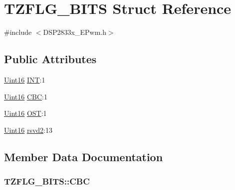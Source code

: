 \hypertarget{struct_t_z_f_l_g___b_i_t_s}{}\section{T\+Z\+F\+L\+G\+\_\+\+B\+I\+T\+S Struct Reference}
\label{struct_t_z_f_l_g___b_i_t_s}


{\ttfamily \#include $<$D\+S\+P2833x\+\_\+\+E\+Pwm.\+h$>$}

\subsection*{Public Attributes}
\begin{DoxyCompactItemize}
\item 
\hyperlink{_d_s_p2833x___device_8h_a59a9f6be4562c327cbfb4f7e8e18f08b}{Uint16} \hyperlink{struct_t_z_f_l_g___b_i_t_s_a30a47948c9f09737b1738836c0675cb8}{I\+N\+T}\+:1
\item 
\hyperlink{_d_s_p2833x___device_8h_a59a9f6be4562c327cbfb4f7e8e18f08b}{Uint16} \hyperlink{struct_t_z_f_l_g___b_i_t_s_ad6b725c9618183cdf803205bebdc4c2b}{C\+B\+C}\+:1
\item 
\hyperlink{_d_s_p2833x___device_8h_a59a9f6be4562c327cbfb4f7e8e18f08b}{Uint16} \hyperlink{struct_t_z_f_l_g___b_i_t_s_a1470de850b06afeaad899784e95a75c9}{O\+S\+T}\+:1
\item 
\hyperlink{_d_s_p2833x___device_8h_a59a9f6be4562c327cbfb4f7e8e18f08b}{Uint16} \hyperlink{struct_t_z_f_l_g___b_i_t_s_ab551b38c80c2eb56f237ecc27053b090}{rsvd2}\+:13
\end{DoxyCompactItemize}


\subsection{Member Data Documentation}
\hypertarget{struct_t_z_f_l_g___b_i_t_s_ad6b725c9618183cdf803205bebdc4c2b}{}
\subsubsection[{C\+B\+C}]{ T\+Z\+F\+L\+G\+\_\+\+B\+I\+T\+S\+::\+C\+B\+C}\label{struct_t_z_f_l_g___b_i_t_s_ad6b725c9618183cdf803205bebdc4c2b}
\hypertarget{struct_t_z_f_l_g___b_i_t_s_a30a47948c9f09737b1738836c0675cb8}{}
